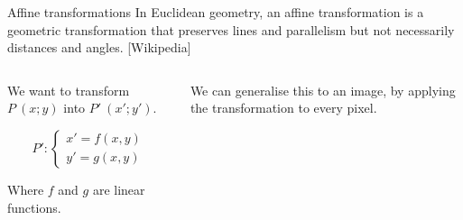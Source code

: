 \documentclass[9pt, aspectratio=169]{beamer}
\begin{document}
\begin{frame}
    {Affine transformations}
    In Euclidean geometry, an affine transformation is a geometric transformation that preserves lines and parallelism but not necessarily distances and angles. [Wikipedia]
    \vspace{2em}

    \begin{columns}
        \begin{column}{0.5\textwidth}{
                \centering

                We want to transform $P~(x;y)$ into $P'~(x';y')$.

                $$P': \begin{cases}x' = f(x,y)\\y' = g(x,y)\end{cases}$$

                \begin{center}
                    Where $f$ and $g$ are linear functions.
                \end{center}
            }
        \end{column}
        \pause
        \begin{column}{0.5\textwidth}
            {We can generalise this to an image, by applying the transformation to every pixel.
                \begin{center}
                    {
                        }
\end{center}}
\end{column}
\end{columns}
\end{frame}
\end{document}
